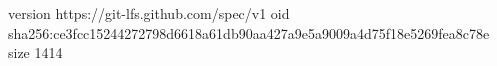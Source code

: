 version https://git-lfs.github.com/spec/v1
oid sha256:ce3fcc15244272798d6618a61db90aa427a9e5a9009a4d75f18e5269fea8c78e
size 1414
